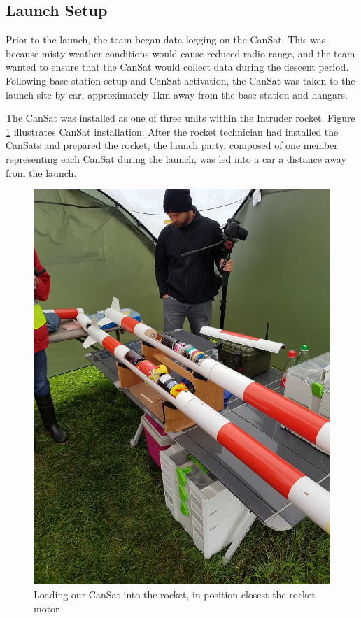 \documentclass[]{report}
\begin{document}
	\subsection{Launch Setup}
	
	Prior to the launch, the team began data logging on the CanSat. This was because misty weather conditions would cause reduced radio range, and the team wanted to ensure that the CanSat would collect data during the descent period. Following base station setup and CanSat activation, the CanSat was taken to the launch site by car, approximately 1km away from the base station and hangars.
	
	The CanSat was installed as one of three units within the Intruder rocket. Figure \ref{rocket} illustrates CanSat installation. After the rocket technician had installed the CanSats and prepared the rocket, the launch party, composed of one member representing each CanSat during the launch, was led into a car a distance away from the launch.
	
	\begin{figure}[h]
		\hfill\includegraphics[scale=0.1, angle=270]{rocket_load.jpg}\hspace*{\fill}
		\caption{Loading our CanSat into the rocket, in position closest the rocket motor}
		\label{rocket}
	\end{figure}
	
\end{document}
